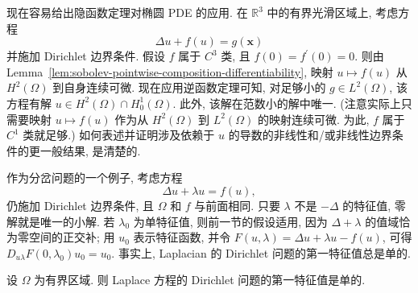 现在容易给出隐函数定理对椭圆 PDE 的应用. 在 $\mathbb{R}^3$ 中的有界光滑区域上, 考虑方程
\begin{equation}\label{eq:semilinear-small-data-dirichlet-equation}
\Delta u+f(u)=g(\bm{x})
\end{equation}
并施加 Dirichlet 边界条件. 假设 $f$ 属于 $C^3$ 类, 且 $f(0)=f^{\prime}(0)=0$. 则由 Lemma~\ref{lem:sobolev-pointwise-composition-differentiability}, 映射 $u\mapsto f(u)$ 从 $H^2(\Omega)$ 到自身连续可微. 现在应用逆函数定理可知, 对足够小的 $g\in L^2(\Omega)$, 该方程有解 $u\in H^2(\Omega)\cap H_0^1(\Omega)$. 此外, 该解在范数小的解中唯一. (注意实际上只需要映射 $u\mapsto f(u)$ 作为从 $H^2(\Omega)$ 到 $L^2(\Omega)$ 的映射连续可微. 为此, $f$ 属于 $C^1$ 类就足够.) 如何表述并证明涉及依赖于 $u$ 的导数的非线性和/或非线性边界条件的更一般结果, 是清楚的.

作为分岔问题的一个例子, 考虑方程
\begin{equation}\label{eq:semilinear-dirichlet-eigenvalue-bifurcation-equation}
\Delta u+\lambda u=f(u),
\end{equation}
仍施加 Dirichlet 边界条件, 且 $\Omega$ 和 $f$ 与前面相同. 只要 $\lambda$ 不是 $-\Delta$ 的特征值, 零解就是唯一的小解. 若 $\lambda_0$ 为单特征值, 则前一节的假设适用, 因为 $\Delta+\lambda$ 的值域恰为零空间的正交补; 用 $u_0$ 表示特征函数, 并令 $F(u,\lambda)=\Delta u+\lambda u-f(u)$, 可得 $D_{u\lambda}F(0,\lambda_0)u_0=u_0$. 事实上, Laplacian 的 Dirichlet 问题的第一特征值总是单的.

\begin{Lemma}
\label{lem:first-dirichlet-eigenvalue-simplicity}
设 $\Omega$ 为有界区域. 则 Laplace 方程的 Dirichlet 问题的第一特征值是单的.
\end{Lemma}

